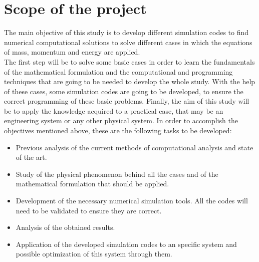 \section{Scope of the project}
The main objective of this study is to develop different simulation codes to find numerical computational solutions to solve different cases in which the equations of mass, momentum and energy are applied.
\\
The first step will be to solve some basic cases in order to learn the fundamentals of the mathematical formulation and the computational and programming techniques that are going to be needed to develop the whole study. With the help of these cases, some simulation codes are going to be developed, to ensure the correct programming of these basic problems.
\newline
Finally, the aim of this study will be to apply the knowledge acquired to a practical case, that may be an engineering system or any other physical system.
\newline
\newline
In order to accomplish the objectives mentioned above, these are the following tasks to be developed:
\begin{itemize}
	\item Previous analysis of the current methods of computational analysis and state of the art.
	\item Study of the physical phenomenon behind all the cases and of the mathematical formulation that should be applied.
	\item Development of the necessary numerical simulation tools. All the codes will need to be validated to ensure they are correct.
	\item Analysis of the obtained results.
	\item Application of the developed simulation codes to an specific system and possible optimization of this system through them.
\end{itemize}
